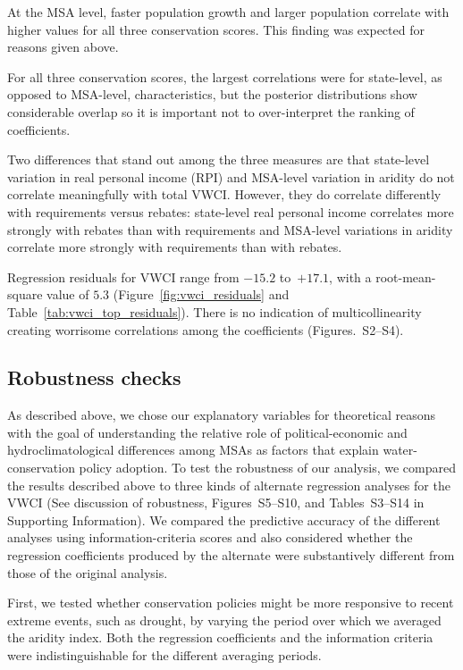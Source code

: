 \documentclass[draft,linenumbers]{agujournal}\usepackage{knitr}
\begin{document}
At the MSA level, faster population growth and larger population correlate with higher values
for all three conservation scores.
This finding was expected for reasons given above.
%
%


For all three conservation scores, the largest correlations were for state-level,
as opposed to MSA-level, characteristics, but the posterior distributions show
considerable overlap so it is important not to over-interpret the ranking of
coefficients.

Two differences that stand out among the three measures are that state-level
variation in real personal income (RPI) and MSA-level variation in aridity
do not correlate meaningfully with
total VWCI. However, they do
correlate differently with
requirements versus rebates:
state-level real personal income
correlates more strongly with rebates
than with requirements
and MSA-level variations in aridity
correlate more strongly with requirements
than with rebates.

%
%

Regression residuals for VWCI range
from $-15.2$
to~$+17.1$,
with a root-mean-square value of
$5.3$
(Figure~\ref{fig:vwci_residuals} and Table~\ref{tab:vwci_top_residuals}).
There is no indication of multicollinearity creating worrisome correlations
among the coefficients (Figures.~S2--S4).
%
%

%
%



\subsection{Robustness checks}
As described above, we chose our explanatory variables
for theoretical reasons with the goal of understanding the relative role of political-economic
and hydroclimatological differences among MSAs as factors that explain water-conservation policy
adoption.
To test the robustness of our analysis,
we compared the results described above to three kinds of alternate regression
analyses for the VWCI
(See discussion of robustness, Figures~S5--S10, and Tables~S3--S14
in Supporting Information).
We compared the predictive accuracy of the different analyses using information-criteria scores
\citep{gelman:predictive:2014,vehtari:loo:2016}
and also considered whether the regression coefficients produced by the alternate were substantively
different from those of the original analysis.

First, we tested whether conservation policies might be more
responsive to recent extreme events, such as drought, by varying the
period over which we averaged the aridity index.
Both the regression coefficients and the information criteria were
indistinguishable for the different averaging periods.
\end{document}
